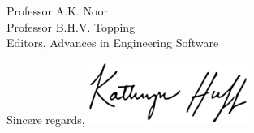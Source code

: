 \documentclass[11pt]{letter} %
\begin{document}
\begin{letter}{Professor A.K. Noor\\
Professor B.H.V. Topping\\
Editors, Advances in Engineering Software}
\closing{Sincere regards,
\includegraphics[height=2cm]{signature}\\
}


\end{letter}
\end{document}
